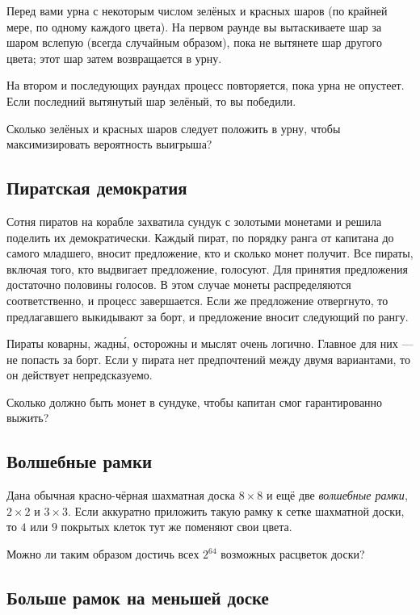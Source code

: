 Перед вами урна с некоторым числом зелёных и красных шаров (по крайней мере, по одному каждого цвета).
На первом раунде вы вытаскиваете шар за шаром вслепую (всегда случайным образом), пока не вытянете шар другого цвета; этот шар затем возвращается в урну.

На втором и последующих раундах процесс повторяется, пока урна не опустеет.
Если последний вытянутый шар зелёный, то вы победили.

Сколько зелёных и красных шаров следует положить в урну, чтобы максимизировать вероятность выигрыша?

\subsection*{Пиратская демократия}

Сотня пиратов на корабле захватила сундук с золотыми монетами и решила поделить их демократически.
Каждый пират, по порядку ранга от капитана до самого младшего, вносит предложение, кто и сколько монет получит.
Все пираты, включая того, кто выдвигает предложение, голосуют.
Для принятия предложения достаточно половины голосов.
В этом случае монеты распределяются соответственно, и процесс завершается.
Если же предложение отвергнуто, то предлагавшего выкидывают за борт, и предложение вносит следующий по рангу.

Пираты коварны, жадн\'{ы}, осторожны и мыслят очень логично.
Главное для них --- не попасть за борт.
Если у пирата нет предпочтений между двумя вариантами, то он действует непредсказуемо.

Сколько должно быть монет в сундуке, чтобы капитан смог гарантированно выжить?

\subsection*{Волшебные рамки}

Дана обычная красно-чёрная шахматная доска $8 \times 8$ и ещё две \emph{волшебные рамки},  $2 \times 2$ и $3 \times 3$.
Если аккуратно приложить такую рамку к сетке шахматной доски, то $4$ или $9$ покрытых клеток тут же поменяют свои цвета.

Можно ли таким образом достичь всех $2^{64}$ возможных расцветок доски?

\subsection*{Больше рамок на меньшей доске}

